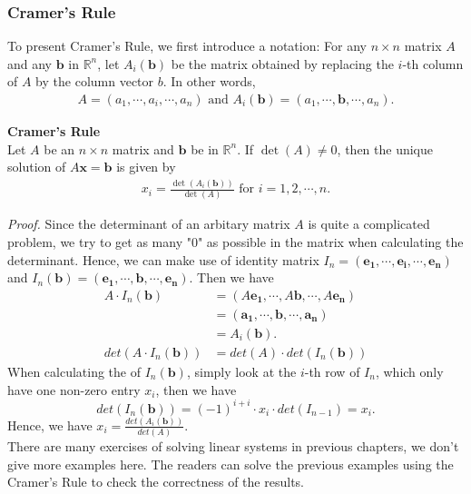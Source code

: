 \documentclass[10pt, a4paper]{article}
\newcommand{\R}{\mathbb{R}}
\begin{document}
\subsubsection*{Cramer's Rule}
\indent To present Cramer's Rule, we first introduce a notation: For any $n\times n$ matrix $A$ and any $\mathbf{b}$ in $\R^n$, let $A_i(\mathbf{b})$ be the matrix obtained by replacing the $i$-th column of $A$ by the column vector $b$. In other words, 
\begin{align*}
    A = (a_1,\cdots,a_i,\cdots,a_n) \text{ and } A_i(\mathbf{b}) = (a_1,\cdots,\mathbf{b},\cdots,a_n).
\end{align*}
\begin{proposition}
    \textbf{Cramer's Rule}\\
    Let $A$ be an $n\times n$ matrix and $\mathbf{b}$ be in $\R^n$. If $\det(A)\neq 0$, then the unique solution of $A\mathbf{x} = \mathbf{b}$ is given by 
    \begin{align*}
        x_i = \frac{\det(A_i(\mathbf{b}))}{\det(A)} \text{ for } i = 1,2,\cdots,n.
    \end{align*}
\end{proposition}
\indent \textit{Proof.} Since the determinant of an arbitary matrix $A$ is quite a complicated problem, we try to get as many "0" as possible in the matrix when calculating the determinant. Hence, we can make use of identity matrix $I_n = (\mathbf{e_1}, \cdots, \mathbf{e_i}, \cdots, \mathbf{e_n})$ and $I_n(\mathbf{b}) = (\mathbf{e_1}, \cdots, \mathbf{b}, \cdots, \mathbf{e_n})$. Then we have
\begin{align*}
    A\cdot I_n(\mathbf{b}) &= (A\mathbf{e_1}, \cdots, A\mathbf{b}, \cdots, A\mathbf{e_n}) \\
    &= (\mathbf{a_1}, \cdots, \mathbf{b}, \cdots, \mathbf{a_n}) \\
    &= A_i(\mathbf{b}).\\
    det(A\cdot I_n(\mathbf{b})) &= det(A)\cdot det(I_n(\mathbf{b})) 
\end{align*}
When calculating the of $I_n(\mathbf{b})$, simply look at the $i$-th row of $I_n$, which only have one non-zero entry $x_i$, then we have $$
det(I_n(\mathbf{b})) = (-1)^{i+i} \cdot x_i \cdot det(I_{n-1}) = x_i.
$$
Hence, we have $x_i = \frac{det(A_i(\mathbf{b}))}{det(A)}$.\\
\indent There are many exercises of solving linear systems in previous chapters, we don't give more examples here. The readers can solve the previous examples using the Cramer's Rule to check the correctness of the results.
\end{document}
